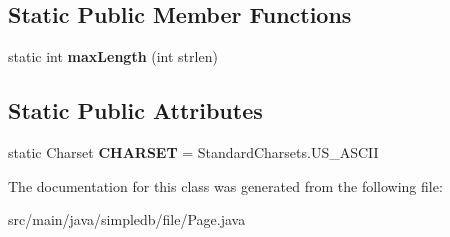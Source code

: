\subsection*{Static Public Member Functions}
\begin{DoxyCompactItemize}
\item 
\mbox{\label{classsimpledb_1_1file_1_1Page_afead053e13d191c539c3ce8eddd07498}} 
static int {\bfseries max\+Length} (int strlen)
\end{DoxyCompactItemize}
\subsection*{Static Public Attributes}
\begin{DoxyCompactItemize}
\item 
\mbox{\label{classsimpledb_1_1file_1_1Page_a15db2dde58273494888f8bcda285aa2e}} 
static Charset {\bfseries C\+H\+A\+R\+S\+ET} = Standard\+Charsets.\+U\+S\+\_\+\+A\+S\+C\+II
\end{DoxyCompactItemize}


The documentation for this class was generated from the following file\+:\begin{DoxyCompactItemize}
\item 
src/main/java/simpledb/file/Page.\+java\end{DoxyCompactItemize}
